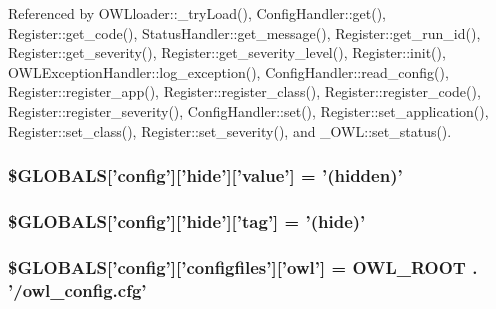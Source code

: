 Referenced by OWLloader::\_\-tryLoad(), ConfigHandler::get(), Register::get\_\-code(), StatusHandler::get\_\-message(), Register::get\_\-run\_\-id(), Register::get\_\-severity(), Register::get\_\-severity\_\-level(), Register::init(), OWLExceptionHandler::log\_\-exception(), ConfigHandler::read\_\-config(), Register::register\_\-app(), Register::register\_\-class(), Register::register\_\-code(), Register::register\_\-severity(), ConfigHandler::set(), Register::set\_\-application(), Register::set\_\-class(), Register::set\_\-severity(), and \_\-OWL::set\_\-status().

\subsubsection[{\$GLOBALS}]{\setlength{\rightskip}{0pt plus 5cm}\$GLOBALS\mbox{[}'config'\mbox{]}\mbox{[}'hide'\mbox{]}\mbox{[}'value'\mbox{]} = '(hidden)'}\label{config_8php_a7b69aee0b150d2e6556beaff4a99e589}
\subsubsection[{\$GLOBALS}]{\setlength{\rightskip}{0pt plus 5cm}\$GLOBALS\mbox{[}'config'\mbox{]}\mbox{[}'hide'\mbox{]}\mbox{[}'tag'\mbox{]} = '(hide)'}\label{config_8php_a15cc7b8e0baf358db666b97bd9c7fcf5}
\subsubsection[{\$GLOBALS}]{\setlength{\rightskip}{0pt plus 5cm}\$GLOBALS\mbox{[}'config'\mbox{]}\mbox{[}'configfiles'\mbox{]}\mbox{[}'owl'\mbox{]} = {\bf OWL\_\-ROOT} . '/owl\_\-config.cfg'}\label{config_8php_a36e909583250c43d72bdc7c09e2d4a20}
